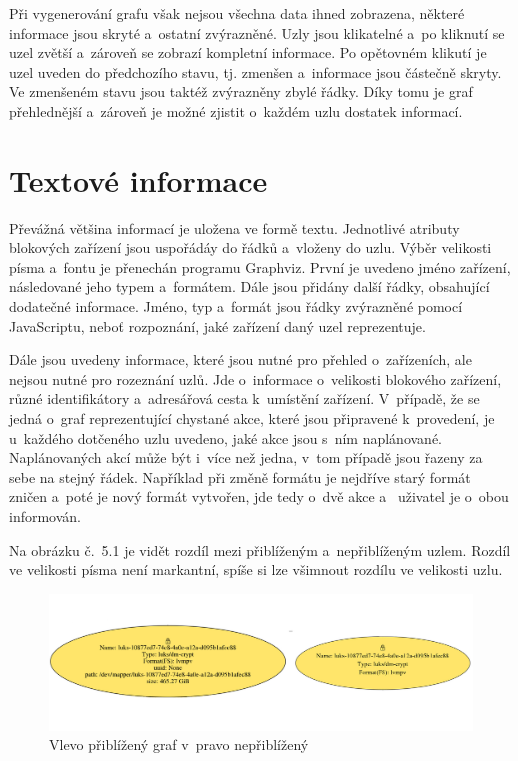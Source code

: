 \documentclass[color,table,oneside,nolot,nolof]{fithesis}
\begin{document}
	Při vygenerování grafu však nejsou všechna data ihned zobrazena, některé informace jsou skryté a~ostatní zvýrazněné. Uzly jsou klikatelné a~po kliknutí
	se uzel zvětší a~zároveň se zobrazí kompletní informace. Po opětovném klikutí je uzel uveden do předchozího stavu, tj. zmenšen a~informace jsou částečně 
	skryty. Ve zmenšeném stavu jsou taktéž zvýrazněny zbylé řádky. Díky tomu je graf přehlednější a~zároveň je možné zjistit o~každém uzlu dostatek informací.

\section{Textové informace}
  Převážná většina informací je uložena ve formě textu. Jednotlivé atributy blokových zařízení jsou uspořádáy do řádků a~vloženy do uzlu. Výběr velikosti
	písma a~fontu je přenechán programu Graphviz. První je uvedeno jméno zařízení, následované jeho typem a~formátem. Dále jsou přidány další řádky, 
	obsahující dodatečné informace. Jméno, typ a~formát jsou řádky zvýrazněné pomocí JavaScriptu, neboť rozpoznání, jaké zařízení daný uzel reprezentuje.

	Dále jsou uvedeny informace, které jsou nutné pro přehled o~zařízeních, ale nejsou nutné pro rozeznání uzlů. Jde o~informace o~velikosti blokového
	zařízení, různé identifikátory a~adresářová cesta k~umístění zařízení. V~případě, že se jedná o~graf reprezentující chystané akce, které jsou připravené
	k~provedení, je u~každého dotčeného uzlu uvedeno, jaké akce jsou s~ním naplánované. Naplánovaných akcí může být i~více než jedna, v~tom případě jsou
	řazeny za sebe na stejný řádek. Například při změně formátu je nejdříve starý formát zničen a~poté je nový formát vytvořen, jde tedy o~dvě akce a~
	uživatel je o~obou informován.

  Na obrázku č.~5.1 je vidět rozdíl mezi přiblíženým a~nepřiblíženým uzlem. Rozdíl ve velikosti písma není markantní, spíše si lze všimnout rozdílu ve velikosti 
	uzlu.

\begin{figure}[]
	\label{fig:Rozdíly uzlů}
	\caption{Vlevo přiblížený graf v~pravo nepřiblížený}
	\centering
	\includegraphics[width=1.0\columnwidth]{pictures/node_zoom.jpg}
\end{figure}
  
\end{document}
